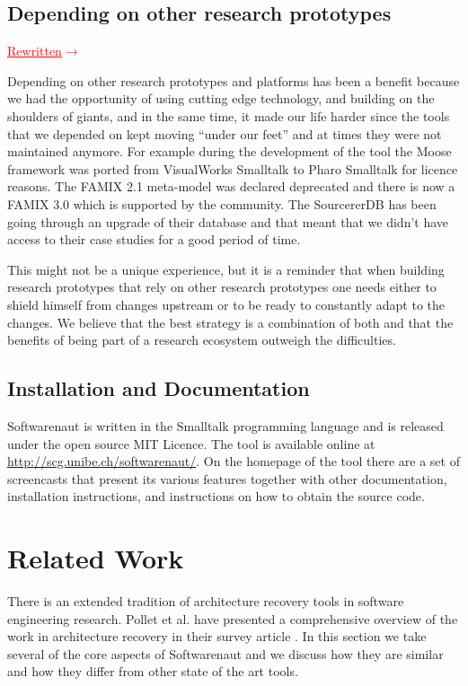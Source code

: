 \documentclass[preprint,12pt]{elsarticle}
\newcommand{\ra}{$\rightarrow$}
\newcommand{\rewritten}{\textcolor{red}{\uline{Rewritten}\ra\space }} %
\begin{document}
\subsection {Depending on other research prototypes }
\rewritten

Depending on other research prototypes and platforms has been a benefit because we had the opportunity of using cutting edge technology, and building on the shoulders of giants, and in the same time, it made our life harder since the tools that we depended on kept moving ``under our feet'' and at times they were not maintained anymore. For example during the development of the tool the Moose framework was ported from VisualWorks Smalltalk to Pharo Smalltalk for licence reasons. The FAMIX 2.1 meta-model was declared deprecated and there is now a FAMIX 3.0 which is supported by the community. The SourcererDB has been going through an upgrade of their database and that meant that we didn't have access to their case studies for a good period of time. 

This might not be a unique experience, but it is a reminder that when building research prototypes that rely on other research prototypes one needs either to shield himself from changes upstream or to be ready to constantly adapt to the changes. We believe that the best strategy is a combination of both and that the benefits of being part of a research ecosystem outweigh the difficulties.


\subsection {Installation and Documentation}
Softwarenaut is written in the Smalltalk programming language and is released under the open source MIT Licence. The tool is available online at {\footnotesize \url{http://scg.unibe.ch/softwarenaut/}}. On the homepage of the tool there are a set of screencasts that present its various features together with other documentation, installation instructions, and instructions on how to obtain the source code. 


\newpage
\section {Related Work}
\label {sec:rel}

There is an extended tradition of architecture recovery tools in software engineering research. Pollet et al. have presented a comprehensive overview of the work in architecture recovery in their survey article \cite{pollet-sar}. In this section we take several of the core aspects of Softwarenaut and we discuss how they are similar and how they differ from other state of the art tools.
\end{document}
